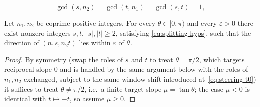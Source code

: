 \documentclass[10pt,a4paper]{amsart}
\begin{document}
  \begin{equation}
    \label{eq:splitting-hyps}
    \tag{H}
    \gcd(s,n_2)=\gcd(t,n_1)=\gcd(s,t)=1,
  \end{equation}

\begin{lemma}[Steering]
  \label{lem:steering}
  Let \(n_1,n_2\) be coprime positive integers. For every \(\theta\in[0,\pi)\) and every
  \(\varepsilon>0\) there exist nonzero integers \(s,t\), \(|s|,|t|\ge2\), satisfying
  \eqref{eq:splitting-hyps}, such that the direction of \((n_1s,n_2t)\) lies within \(\varepsilon\) of
  \(\theta\).
\end{lemma}

\begin{proof}
  By symmetry (swap the roles of \(s\) and \(t\) to treat \(\theta=\pi/2\), which targets reciprocal
  slope \(0\) and is handled by the same argument below with the roles of \(n_1,n_2\) exchanged,
  subject to the same window shift introduced at~\eqref{eq:steering-t0}) it suffices to treat
  \(\theta\ne\pi/2\), i.e.\ a finite target slope \(\mu=\tan\theta\); the case \(\mu<0\) is identical
  with \(t\mapsto-t\), so assume \(\mu\ge0\).


\end{proof}
\end{document}
